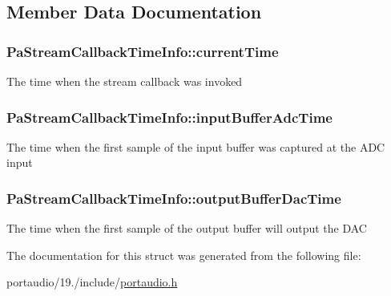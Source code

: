 \subsection{Member Data Documentation}
\hypertarget{struct_pa_stream_callback_time_info_af21eb5482cadb212dae38fdbbd9bebfb}{
\subsubsection[{current\+Time}]{ Pa\+Stream\+Callback\+Time\+Info\+::current\+Time}}\label{struct_pa_stream_callback_time_info_af21eb5482cadb212dae38fdbbd9bebfb}
The time when the stream callback was invoked \hypertarget{struct_pa_stream_callback_time_info_ad114a6d5e1cf2cdd75837c33c1c8bb4c}{
\subsubsection[{input\+Buffer\+Adc\+Time}]{ Pa\+Stream\+Callback\+Time\+Info\+::input\+Buffer\+Adc\+Time}}\label{struct_pa_stream_callback_time_info_ad114a6d5e1cf2cdd75837c33c1c8bb4c}
The time when the first sample of the input buffer was captured at the A\+D\+C input \hypertarget{struct_pa_stream_callback_time_info_aa2052c42394fca748e83517fc8942609}{
\subsubsection[{output\+Buffer\+Dac\+Time}]{ Pa\+Stream\+Callback\+Time\+Info\+::output\+Buffer\+Dac\+Time}}\label{struct_pa_stream_callback_time_info_aa2052c42394fca748e83517fc8942609}
The time when the first sample of the output buffer will output the D\+A\+C 

The documentation for this struct was generated from the following file\+:\begin{DoxyCompactItemize}
\item 
portaudio/19./include/\hyperlink{portaudio_8h}{portaudio.\+h}\end{DoxyCompactItemize}
